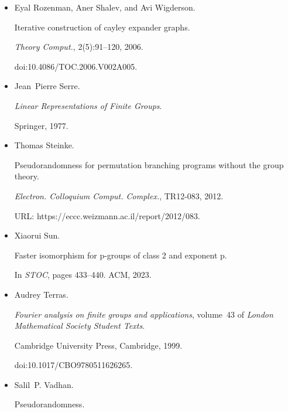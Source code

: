\begin{itemize}
\item[] 
[44]

Eyal Rozenman, Aner Shalev, and Avi Wigderson.


Iterative construction of cayley expander graphs.


\emph{Theory Comput.}, 2(5):91–120, 2006.


doi:10.4086/TOC.2006.V002A005.





\item[] 
[45]

Jean Pierre Serre.


\emph{Linear Representations of Finite Groups}.


Springer, 1977.





\item[] 
[46]

Thomas Steinke.


Pseudorandomness for permutation branching programs without the group
theory.


\emph{Electron. Colloquium Comput. Complex.}, TR12-083, 2012.


URL: https://eccc.weizmann.ac.il/report/2012/083.





\item[] 
[47]

Xiaorui Sun.


Faster isomorphism for p-groups of class 2 and exponent p.


In \emph{STOC}, pages 433–440. ACM, 2023.





\item[] 
[48]

Audrey Terras.


\emph{Fourier analysis on finite groups and applications}, volume 43
of \emph{London Mathematical Society Student Texts}.


Cambridge University Press, Cambridge, 1999.


doi:10.1017/CBO9780511626265.





\item[] 
[49]

Salil P. Vadhan.


Pseudorandomness.



\end{itemize}
